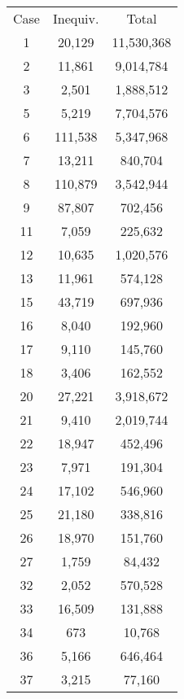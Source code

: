 \documentclass[letterpaper]{article}
\begin{document}
\def\X{\phantom0}
\begin{table}\centering
\begin{tabular}{ccc}
Case  & Inequiv. & Total    \\
   \X1 & \hfill   20,129 & \hfill11,530,368 \\ 
   \X2 & \hfill   11,861 & \hfill9,014,784 \\ 
   \X3 & \hfill    2,501 & \hfill1,888,512 \\ 
   \X5 & \hfill    5,219 & \hfill7,704,576 \\ 
   \X6 & \hfill  111,538 & \hfill5,347,968 \\ 
   \X7 & \hfill   13,211 & \hfill 840,704 \\ 
   \X8 & \hfill  110,879 & \hfill3,542,944 \\ 
   \X9 & \hfill   87,807 & \hfill 702,456 \\ 
    11 & \hfill    7,059 & \hfill 225,632 \\ 
    12 & \hfill   10,635 & \hfill1,020,576 \\ 
    13 & \hfill   11,961 & \hfill 574,128 \\ 
    15 & \hfill   43,719 & \hfill 697,936 \\ 
    16 & \hfill    8,040 & \hfill 192,960 \\ 
    17 & \hfill    9,110 & \hfill 145,760 \\ 
    18 & \hfill    3,406 & \hfill 162,552 \\ 
    20 & \hfill   27,221 & \hfill3,918,672 \\ 
    21 & \hfill    9,410 & \hfill2,019,744 \\ 
    22 & \hfill   18,947 & \hfill 452,496 \\ 
    23 & \hfill    7,971 & \hfill 191,304 \\ 
    24 & \hfill   17,102 & \hfill 546,960 \\ 
    25 & \hfill   21,180 & \hfill 338,816 \\ 
    26 & \hfill   18,970 & \hfill 151,760 \\ 
    27 & \hfill    1,759 & \hfill  84,432 \\ 
    32 & \hfill    2,052 & \hfill 570,528 \\ 
    33 & \hfill   16,509 & \hfill 131,888 \\ 
    34 & \hfill      673 & \hfill  10,768 \\ 
    36 & \hfill    5,166 & \hfill 646,464 \\ 
    37 & \hfill    3,215 & \hfill  77,160 \\ 

\end{tabular}
\end{table}
\end{document}
